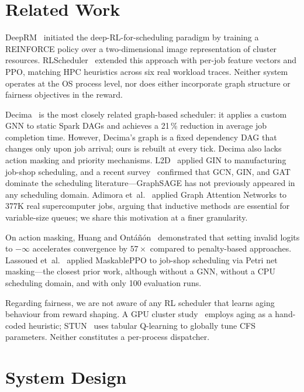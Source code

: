 \documentclass[conference]{IEEEtran}
\begin{document}
\section{Related Work}
\label{sec:related}

DeepRM~\cite{deeprm} initiated the deep-RL-for-scheduling paradigm by
training a REINFORCE policy over a two-dimensional image representation
of cluster resources.  RLScheduler~\cite{rls} extended this approach
with per-job feature vectors and PPO, matching HPC heuristics across six
real workload traces.  Neither system operates at the OS process level,
nor does either incorporate graph structure or fairness objectives in the
reward.

Decima~\cite{decima} is the most closely related graph-based scheduler:
it applies a custom GNN to static Spark DAGs and achieves a 21\,\%
reduction in average job completion time.  However, Decima's graph is a
fixed dependency DAG that changes only upon job arrival; ours is rebuilt
at every tick.  Decima also lacks action masking and priority
mechanisms.  L2D~\cite{l2d} applied GIN to manufacturing job-shop
scheduling, and a recent survey~\cite{jsspsurvey} confirmed that GCN,
GIN, and GAT dominate the scheduling literature---GraphSAGE has not
previously appeared in any scheduling domain.  Adimora
et~al.~\cite{adimora24} applied Graph Attention Networks to 377K real
supercomputer jobs, arguing that inductive methods are essential for
variable-size queues; we share this motivation at a finer granularity.

On action masking, Huang and
Ont\'{a}\~{n}\'{o}n~\cite{masking} demonstrated that setting invalid
logits to $-\infty$ accelerates convergence by $57\times$ compared to
penalty-based approaches.  Lassoued et~al.~\cite{lassoued26} applied
MaskablePPO to job-shop scheduling via Petri net masking---the closest
prior work, although without a GNN, without a CPU scheduling domain, and
with only 100 evaluation runs.

Regarding fairness, we are not aware of any RL scheduler that learns
aging behaviour from reward shaping.  A GPU cluster
study~\cite{gpuaging} employs aging as a hand-coded heuristic;
STUN~\cite{stun} uses tabular Q-learning to globally tune CFS
parameters.  Neither constitutes a per-process dispatcher.

\section{System Design}
\label{sec:design}
\end{document}
